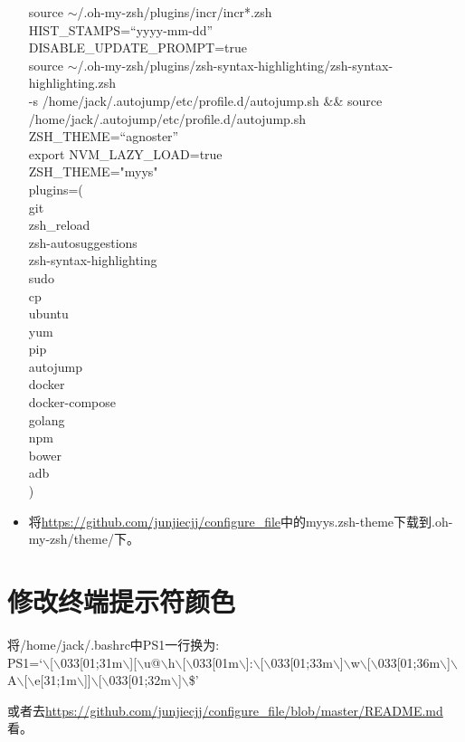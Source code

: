 \documentclass[utf8]{book}
\begin{document}
\begin{appendices}
\begin{itemize}
		source  $\sim$/.oh-my-zsh/plugins/incr/incr*.zsh\\
		HIST\_STAMPS=“yyyy-mm-dd” \\
		DISABLE\_UPDATE\_PROMPT=true \\
		source $\sim$/.oh-my-zsh/plugins/zsh-syntax-highlighting/zsh-syntax-highlighting.zsh\\
		 \lbrack\lbrack-s /home/jack/.autojump/etc/profile.d/autojump.sh \rbrack\rbrack \&\& source /home/jack/.autojump/etc/profile.d/autojump.sh\\
		ZSH\_THEME=“agnoster”\\
		export NVM\_LAZY\_LOAD=true\\
		ZSH\_THEME="myys"\\
		plugins=(\\
		git\\
		zsh\_reload\\
		zsh-autosuggestions\\
		zsh-syntax-highlighting\\
		sudo\\
		cp\\
		ubuntu\\
		yum\\
		pip\\
		autojump\\
		docker\\
		docker-compose\\
		golang\\
		npm\\
		bower\\
		adb\\
		)\\
	\item 将\url{https://github.com/junjiecjj/configure_file}中的myys.zsh-theme下载到.oh-my-zsh/theme/下。
	\end{itemize}
	\section{修改终端提示符颜色}
	将/home/jack/.bashrc中PS1一行换为:\\
	PS1=‘$\backslash$[$\backslash$033[01;31m$\backslash$][$\backslash$u@$\backslash$h$\backslash$[$\backslash$033[01m$\backslash$]:$\backslash$[$\backslash$033[01;33m$\backslash$]$\backslash$w$\backslash$[$\backslash$033[01;36m$\backslash$]$\backslash$
	A$\backslash$[$\backslash$e[31;1m$\backslash$]]$\backslash$[$\backslash$033[01;32m$\backslash$]$\backslash$\$’
	
	或者去\url{https://github.com/junjiecjj/configure_file/blob/master/README.md}看。
		

\end{appendices}
\end{document}
